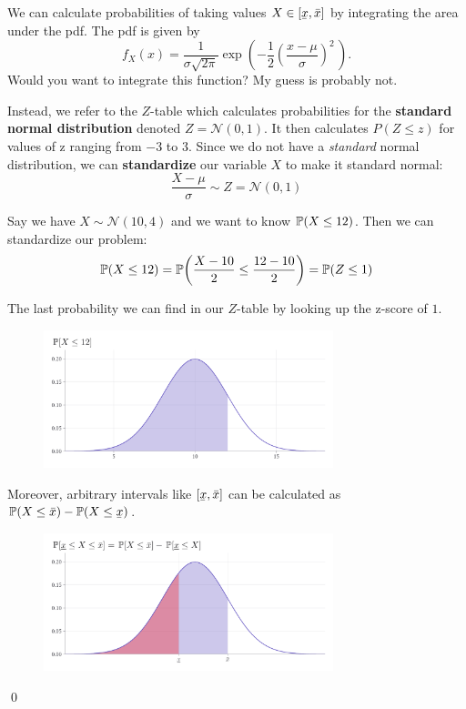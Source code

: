 \documentclass[12pt]{article}
\begin{document}
We can calculate probabilities of taking values $X \in [\ubar{x}, \bar{x}]$ by integrating the area under the pdf. The pdf is given by
$$
  f_X(x) = \frac{1}{\sigma\sqrt{2\pi}} \exp\left( -\frac{1}{2}\left(\frac{x-\mu}{\sigma}\right)^{\!2}\,\right).
$$
Would you want to integrate this function? My guess is probably not.

Instead, we refer to the $Z$-table which calculates probabilities for the \textbf{standard normal distribution} denoted $Z = \mathcal{N}(0, 1)$. It then calculates $P(Z \leq z)$ for values of z ranging from $-3$ to $3$. Since we do not have a \emph{standard} normal distribution, we can \textbf{standardize} our variable $X$ to make it standard normal:
$$
  \frac{X - \mu}{\sigma} \sim Z = \mathcal{N}(0, 1)
$$

\begin{example}
  Say we have $X \sim \mathcal{N}(10, 4)$ and we want to know $\prob{X \leq 12}$. Then we can standardize our problem:
  $$
    \prob{X \leq 12} = \prob{\frac{X - 10}{2} \leq \frac{12 - 10}{2}} = \prob{Z \leq 1}
  $$

  The last probability we can find in our $Z$-table by looking up the z-score of $1$.

  \begin{figure}[h!]
    \begin{center}
      \includegraphics[width=0.75\textwidth]{figures/ex_probability_leq.pdf}
    \end{center}
  \end{figure}

  Moreover, arbitrary intervals like $[\ubar{x}, \bar{x}]$ can be calculated as $\prob{X \leq \bar{x}} - \prob{X \leq \ubar{x}}$.

  \begin{figure}[h!]
    \begin{center}
      \includegraphics[width=0.75\textwidth]{figures/ex_probability_between.pdf}
    \end{center}
  \end{figure}

  \qed
\end{example}
\end{document}
